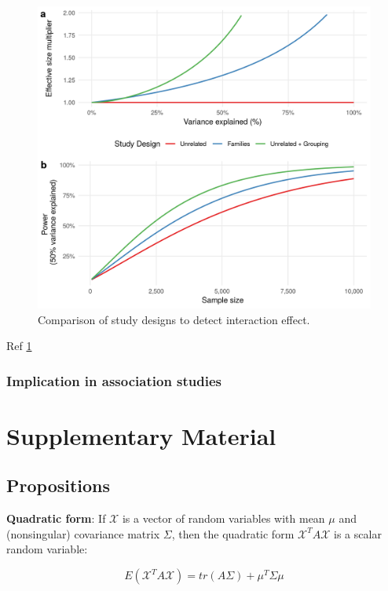 \documentclass[]{book}
\theoremstyle{definition}
\theoremstyle{definition}
\theoremstyle{definition}
\theoremstyle{remark}
\begin{document}
\begin{figure}

{\centering \includegraphics[width=0.75\linewidth]{figures/09-figure-power-interaction-expsib-two-panels} 

}

\caption{Comparison of study designs to detect
interaction effect.}\label{fig:power-interaction}
\end{figure}




Ref \ref{fig:power-interaction}

\subsection{Implication in association
studies}\label{implication-in-association-studies}

\chapter{Supplementary Material}\label{supplementary-material}

\section{Propositions}\label{propositions}

\textbf{Quadratic form}: If \(\mathcal{X}\) is a vector of random
variables with mean \(\mu\) and (nonsingular) covariance matrix
\(\Sigma\), then the quadratic form \(\mathcal{X}^T A \mathcal{X}\) is a
scalar random variable:

\begin{equation} 
E(\mathcal{X}^T A \mathcal{X}) = tr(A\Sigma) + \mu^T \Sigma \mu
\label{eq:quadform1}
\end{equation}
\end{document}
